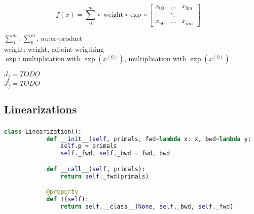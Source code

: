 \documentclass[aspectratio=169,xcolor=dvipsnames]{beamer}
\begin{document}
\begin{frame}
	\frametitle{\insertsection}
	\framesubtitle{\insertsubsection}

	\begin{equation*}
		f(x) =
		\sum_0^m
		\circ
		\ \text{weight}
		\circ
		\exp
		\circ
		\begin{bmatrix}
			x_{00} & \dots & x_{0m} \\
			\vdots & \ddots & \\
			x_{n0} & \dots & x_{nm}
		\end{bmatrix}
	\end{equation*}

	$\sum_0^m$: $\sum_0^m$, outer-product
	\\ weight: weight, adjoint weigthing
	\\ $\exp$: multiplication with $\exp(x^{(0)})$, multiplication with $\exp(x^{(0)})$

	\vspace{2em}

	$J_f = TODO$
	\\ $J_f^\dagger = TODO$

\end{frame}

\subsection{Linearizations}
\begin{frame}[fragile]
	\frametitle{\insertsection}
	\framesubtitle{\insertsubsection}

	\begin{lstlisting}[language=python,escapechar=!]
		class Linearization():
			def __init__(self, primals, fwd=lambda x: x, bwd=lambda y: y):
				self.p = primals
				self._fwd, self,_bwd = fwd, bwd

			def __call__(self, primals):
				return self._fwd(primals)

			@property
			def T(self):
				return self.__class__(None, self._bwd, self._fwd)
	\end{lstlisting}

\end{frame}
\end{document}
